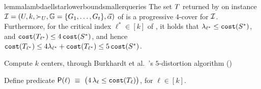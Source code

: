 \documentclass{article}
\begin{document}
\begin{restatable}{lemma}{lambdaellstarlowerboundsmallerqueries}
    \label{lemma:lambda-ell-star-lower-bound-smaller-queries}
    The set $T$ returned by \bcfrss on instance $\mathcal{I}=(U,k, \succ_U, \mathbb{G}=\{G_1,\dots,G_t\},\vec{\alpha})$ of \ordfairkcen is
    a progressive $4$-cover for $\mathcal{I}$.
    Furthermore, for the critical index $\ell^* \in [k]$ of \OptSolSet, it holds that
    $\lambda_{\ell^*} \leq \texttt{cost}(S^*)$, and $\texttt{cost}(T_{\ell^*}) \leq 4\, \texttt{cost}(S^*)$, and hence $\texttt{cost}(T_{\ell^*}) \leq 4\lambda_{\ell^*} + \texttt{cost}(T_{\ell^*}) \leq 5\, \texttt{cost}(S^*)$.
\end{restatable}




\begin{algorithm}[]
\SetAlgoNoEnd
    \caption{$5$-Distortion Algorithm}
    \label{alg:ordinal-fair-k-center-quality-ell}
    \SetAlgoLined

   Compute $k$ centers, \InitSolSet through Burkhardt et al.~\cite{burkhardt2024low}'s $5$-distortion algorithm ()\label{algo:init}

   Define predicate 
    $\mathsf{P}(\ell) ~\equiv~ \bigl( 4\,\lambda_{\ell} \leq \texttt{cost}(T_{\ell}) \bigr)$,
     for $\ell\in[k]$.\label{algo:pred}




    \label{algo:base1}

    
    \label{algo:basek}


    
\end{algorithm}
\end{document}
